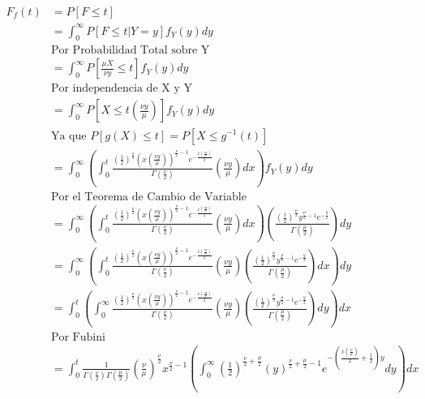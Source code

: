 \documentclass[letterpaper]{article}
\theoremstyle{definition}
\theoremstyle{lemathm}
\theoremstyle{lemathm}
\theoremstyle{lemademthm}
\newcommand{\pars}[1]{\left( #1 \right) }
\newcommand{\bracs}[1]{\left[ #1 \right] }
\newcommand{\1}{\mathbbm{1}}
\begin{document}
\begin{enumerate}
		\begin{align*}
			F_f(t) &= P\bracs{F \leq t}\\
			&= \int_{0}^{\infty} P\bracs{F\leq t | Y = y} f_Y(y) dy\\
			& \text{Por Probabilidad Total sobre Y}\\
			&= \int_{0}^{\infty} P\bracs{\frac{\mu X}{\nu y} \leq t} f_Y(y) dy\\
			&\text{Por independencia de X y Y}\\
			&= \int_{0}^{\infty} P\bracs{X \leq t\pars{\frac{\nu y}{\mu}}} f_Y(y) dy\\
			& \text{Ya que $P\bracs{g(X) \leq t} = P\bracs{X \leq g^{-1}(t)}$}\\
			&= \int_{0}^{\infty} \pars{\int_{0}^t \frac{\pars{\frac{1}{2}}^{\frac{\nu}{2}} \pars{x\pars{\frac{\nu y}{\mu}}}^{\frac{\nu}{2}-1} e^{-\frac{x\pars{\frac{\nu y}{\mu}}}{2}}}{\Gamma\pars{\frac{\nu}{2}}} \pars{\frac{\nu y}{\mu}} dx} f_Y(y) dy\\
			& \text{Por el Teorema de Cambio de Variable}\\
			&= \int_{0}^{\infty} \pars{\int_{0}^t \frac{\pars{\frac{1}{2}}^{\frac{\nu}{2}} \pars{x\pars{\frac{\nu y}{\mu}}}^{\frac{\nu}{2}-1} e^{-\frac{x\pars{\frac{\nu y}{\mu}}}{2}}}{\Gamma\pars{\frac{\nu}{2}}} \pars{\frac{\nu y}{\mu}} dx} \pars{\frac{\pars{\frac{1}{2}}^{\frac{\mu}{2}} y^{\frac{\mu}{2}-1}e^{-\frac{y}{2}}}{\Gamma\pars{\frac{\mu}{2}}}} dy\\
			&= \int_{0}^{\infty} \pars{\int_{0}^t \frac{\pars{\frac{1}{2}}^{\frac{\nu}{2}} \pars{x\pars{\frac{\nu y}{\mu}}}^{\frac{\nu}{2}-1} e^{-\frac{x\pars{\frac{\nu y}{\mu}}}{2}}}{\Gamma\pars{\frac{\nu}{2}}} \pars{\frac{\nu y}{\mu}} \pars{\frac{\pars{\frac{1}{2}}^{\frac{\mu}{2}} y^{\frac{\mu}{2}-1}e^{-\frac{y}{2}}}{\Gamma\pars{\frac{\mu}{2}}}} dx} dy\\
			&= \int_{0}^t \pars{\int_{0}^{\infty} \frac{\pars{\frac{1}{2}}^{\frac{\nu}{2}} \pars{x\pars{\frac{\nu y}{\mu}}}^{\frac{\nu}{2}-1} e^{-\frac{x\pars{\frac{\nu y}{\mu}}}{2}}}{\Gamma\pars{\frac{\nu}{2}}} \pars{\frac{\nu y}{\mu}} \pars{\frac{\pars{\frac{1}{2}}^{\frac{\mu}{2}} y^{\frac{\mu}{2}-1}e^{-\frac{y}{2}}}{\Gamma\pars{\frac{\mu}{2}}}} dy} dx\\
			& \text{Por Fubini}\\
			&= \int_{0}^t \frac{1}{\Gamma\pars{\frac{\nu}{2}}\Gamma\pars{\frac{\mu}{2}}} \pars{\frac{\nu}{\mu}}^{\frac{\nu}{2}} x^{\frac{\nu}{2}-1} \pars{\int_{0}^{\infty} \pars{\frac{1}{2}}^{\frac{\nu}{2} + \frac{\mu}{2}} \pars{y}^{\frac{\nu}{2} + \frac{\mu}{2} -1} e^{-\pars{\frac{x\pars{\frac{\nu}{\mu}}}{2} + \frac{1}{2}}y} dy} dx\\

\end{align*}
\end{enumerate}
\end{document}
